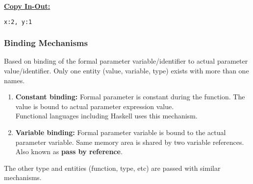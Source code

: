 \begin{minipage}{.05\linewidth}
  \vspace*{\fill}
  \hspace*{\fill}
\end{minipage}%
\begin{minipage}{.29\linewidth}

  \underline{\textbf{Copy In-Out:}}


  \texttt{x:2, y:1}

\end{minipage}

\subsubsection{Binding Mechanisms}

Based on binding of the formal parameter variable/identifier to actual parameter value/identifier. Only one entity (value, variable, type) exists with more than one names.
\begin{enumerate}
  \item \textbf{Constant binding:} Formal parameter is constant during the function. The value is bound to actual parameter expression value. \\
  Functional languages including Haskell uses this mechanism.
  \item \textbf{Variable binding:} Formal parameter variable is bound to the actual parameter variable. Same memory area is shared by two variable references.\\  
  Also known as \textbf{pass by reference}.
\end{enumerate}
The other type and entities (function, type, etc) are passed with similar mechanisms. 

